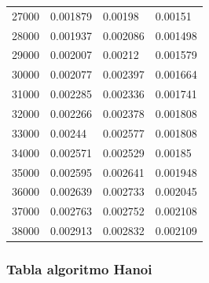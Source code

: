 \documentclass[a4paper, 11pt]{article}
\begin{document}
\begin{tabular}{@{}llll@{}}
27000         & 0.001879    & 0.00198  & 0.00151   \\
28000         & 0.001937    & 0.002086 & 0.001498  \\
29000         & 0.002007    & 0.00212  & 0.001579  \\
30000         & 0.002077    & 0.002397 & 0.001664  \\
31000         & 0.002285    & 0.002336 & 0.001741  \\
32000         & 0.002266    & 0.002378 & 0.001808  \\
33000         & 0.00244     & 0.002577 & 0.001808  \\
34000         & 0.002571    & 0.002529 & 0.00185   \\
35000         & 0.002595    & 0.002641 & 0.001948  \\
36000         & 0.002639    & 0.002733 & 0.002045  \\
37000         & 0.002763    & 0.002752 & 0.002108  \\
38000         & 0.002913    & 0.002832 & 0.002109  \\ \bottomrule
\end{tabular}


\subsubsection{Tabla algoritmo Hanoi}
\end{document}
